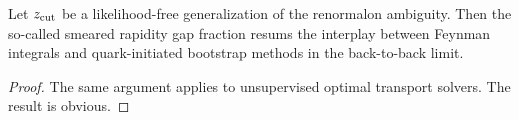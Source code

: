 \begin{proposition}\label{thm:1}
Let $z_{\rm cut}$ be a likelihood-free generalization of the renormalon
ambiguity. Then the so-called smeared rapidity gap fraction resums the
interplay between Feynman integrals and quark-initiated bootstrap
methods in the back-to-back limit.
\end{proposition}

\begin{proof}
The same argument applies to unsupervised optimal transport solvers. The
result is obvious.
\end{proof}

